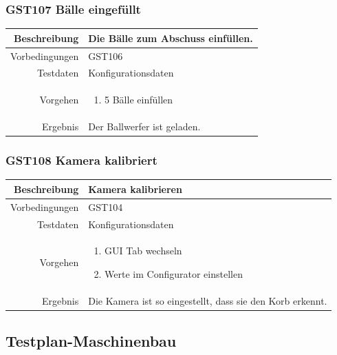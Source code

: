 \subsubsection{GST107 Bälle eingefüllt}
\begin{table}[h!]
	\renewcommand{\arraystretch}{1.5}
	\begin{tabular}{|r|p{14cm}|}
		\hline Beschreibung & Die Bälle zum Abschuss einfüllen. \\ 
		\hline Vorbedingungen &  GST106\\ 
		\hline Testdaten & Konfigurationsdaten \\ 
		\hline Vorgehen & 
		\begin{enumerate}
			\item 5 Bälle einfüllen
		\end{enumerate} \\ 
		\hline Ergebnis & Der Ballwerfer ist geladen. \\ 
		\hline 
	\end{tabular}
\end{table}

\subsubsection{GST108 Kamera kalibriert}
\begin{table}[h!]
	\renewcommand{\arraystretch}{1.5}
	\begin{tabular}{|r|p{14cm}|}
		\hline Beschreibung & Kamera kalibrieren \\ 
		\hline Vorbedingungen &  GST104\\ 
		\hline Testdaten & Konfigurationsdaten \\ 
		\hline Vorgehen & 
		\begin{enumerate}
			\item GUI Tab wechseln
			\item Werte im Configurator einstellen
		\end{enumerate} \\ 
		\hline Ergebnis & Die Kamera ist so eingestellt, dass sie den Korb erkennt. \\ 
		\hline 
	\end{tabular}
\end{table}

\newpage
\subsection{Testplan-Maschinenbau}
